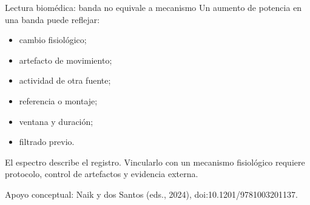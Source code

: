 \documentclass[
  ignorenonframetext,
  aspectratio=169,
  spanish,
  professionalfonts]{beamer}
\providecommand{\tightlist}{%
  \setlength{\itemsep}{0pt}\setlength{\parskip}{0pt}}
\begin{document}
\begin{frame}{Lectura biomédica: banda no equivale a mecanismo}
\protect{}\label{lectura-biomuxe9dica-banda-no-equivale-a-mecanismo}
Un aumento de potencia en una banda puede reflejar:

\begin{itemize}
\tightlist
\item
  cambio fisiológico;
\item
  artefacto de movimiento;
\item
  actividad de otra fuente;
\item
  referencia o montaje;
\item
  ventana y duración;
\item
  filtrado previo.
\end{itemize}

\begin{tcolorbox}[enhanced jigsaw, arc=.35mm, bottomrule=.15mm, bottomtitle=1mm, breakable, colback=white, colbacktitle=quarto-callout-important-color!10!white, colframe=quarto-callout-important-color-frame, coltitle=black, left=2mm, leftrule=.75mm, opacityback=0, opacitybacktitle=0.6, rightrule=.15mm, title={Rigor interpretativo}, titlerule=0mm, toprule=.15mm, toptitle=1mm]

El espectro describe el registro. Vincularlo con un mecanismo
fisiológico requiere protocolo, control de artefactos y evidencia
externa.

\end{tcolorbox}

Apoyo conceptual: Naik y dos Santos (eds., 2024),
doi:10.1201/9781003201137.
\end{frame}
\end{document}
